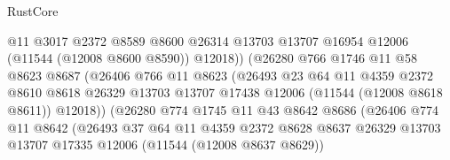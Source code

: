 \begin{lexlean}{RustCore}
\begin{coremodule}
                                  @11
                                  @3017
                                  @2372
                                  @8589
                                  @8600
                                  @26314
                                  @13703
                                  @13707
                                  @16954
                                  @12006
                                  (@11544 (@12008 @8600 @8590))
                                  @12018))
                              (@26280
                                @766
                                @1746
                                @11
                                @58
                                @8623
                                @8687
                                (@26406
                                  @766
                                  @11
                                  @8623
                                  (@26493
                                    @23
                                    @64
                                    @11
                                    @4359
                                    @2372
                                    @8610
                                    @8618
                                    @26329
                                    @13703
                                    @13707
                                    @17438
                                    @12006
                                    (@11544 (@12008 @8618 @8611))
                                    @12018))
                                (@26280
                                  @774
                                  @1745
                                  @11
                                  @43
                                  @8642
                                  @8686
                                  (@26406
                                    @774
                                    @11
                                    @8642
                                    (@26493
                                      @37
                                      @64
                                      @11
                                      @4359
                                      @2372
                                      @8628
                                      @8637
                                      @26329
                                      @13703
                                      @13707
                                      @17335
                                      @12006
                                      (@11544 (@12008 @8637 @8629))

\end{coremodule}
\end{lexlean}
